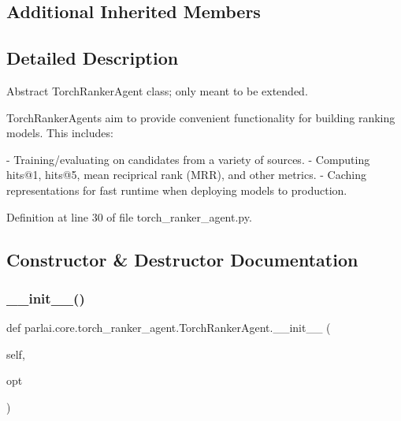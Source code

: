 \subsection*{Additional Inherited Members}


\subsection{Detailed Description}
\begin{DoxyVerb}Abstract TorchRankerAgent class; only meant to be extended.

TorchRankerAgents aim to provide convenient functionality for building ranking
models. This includes:

- Training/evaluating on candidates from a variety of sources.
- Computing hits@1, hits@5, mean reciprical rank (MRR), and other metrics.
- Caching representations for fast runtime when deploying models to production.
\end{DoxyVerb}
 

Definition at line 30 of file torch\+\_\+ranker\+\_\+agent.\+py.



\subsection{Constructor \& Destructor Documentation}
\mbox{\label{classparlai_1_1core_1_1torch__ranker__agent_1_1TorchRankerAgent_a083b1d10ef8d3d38fdfd026aea95e267}} 
\subsubsection{\texorpdfstring{\+\_\+\+\_\+init\+\_\+\+\_\+()}{\_\_init\_\_()}}
{\footnotesize\ttfamily def parlai.\+core.\+torch\+\_\+ranker\+\_\+agent.\+Torch\+Ranker\+Agent.\+\_\+\+\_\+init\+\_\+\+\_\+ (\begin{DoxyParamCaption}\item[{}]{self,  }\item[{}]{opt }\end{DoxyParamCaption})}



